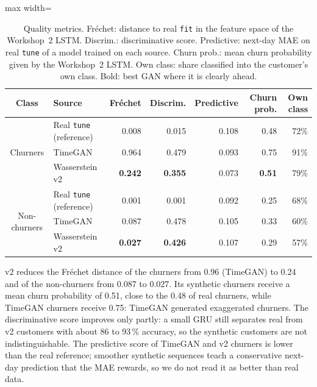 \documentclass{article}
\begin{document}
\begin{table}[H]
\centering
\renewcommand{\arraystretch}{1.3}
\begin{adjustbox}{max width=\textwidth}
\begin{tabular}{|c|l|r|r|r|r|r|}
\hline
\textbf{Class} & \textbf{Source} & \textbf{Fréchet} & \textbf{Discrim.} & \textbf{Predictive} & \textbf{Churn prob.} & \textbf{Own class} \\ \hline
\multirow{3}{*}{Churners} & Real \texttt{tune} (reference) & 0.008 & 0.015 & 0.108 & 0.48 & 72\% \\ \cline{2-7}
 & TimeGAN & 0.964 & 0.479 & 0.093 & 0.75 & 91\% \\ \cline{2-7}
 & Wasserstein v2 & \textbf{0.242} & \textbf{0.355} & 0.073 & \textbf{0.51} & 79\% \\ \hline
\multirow{3}{*}{Non-churners} & Real \texttt{tune} (reference) & 0.001 & 0.001 & 0.092 & 0.25 & 68\% \\ \cline{2-7}
 & TimeGAN & 0.087 & 0.478 & 0.105 & 0.33 & 60\% \\ \cline{2-7}
 & Wasserstein v2 & \textbf{0.027} & \textbf{0.426} & 0.107 & 0.29 & 57\% \\ \hline
\end{tabular}
\end{adjustbox}
\caption{Quality metrics. Fréchet: distance to real \texttt{fit} in the feature space of the Workshop~2 LSTM. Discrim.: discriminative score. Predictive: next-day MAE on real \texttt{tune} of a model trained on each source. Churn prob.: mean churn probability given by the Workshop~2 LSTM. Own class: share classified into the customer's own class. Bold: best GAN where it is clearly ahead.}
\label{tab:w5_quality}
\end{table}

v2 reduces the Fréchet distance of the churners from 0.96 (TimeGAN) to 0.24 and of the non-churners from 0.087 to 0.027. Its synthetic churners receive a mean churn probability of 0.51, close to the 0.48 of real churners, while TimeGAN churners receive 0.75: TimeGAN generated exaggerated churners. The discriminative score improves only partly: a small GRU still separates real from v2 customers with about 86 to 93\,\% accuracy, so the synthetic customers are not indistinguishable. The predictive score of TimeGAN and v2 churners is lower than the real reference; smoother synthetic sequences teach a conservative next-day prediction that the MAE rewards, so we do not read it as better than real data.
\end{document}
